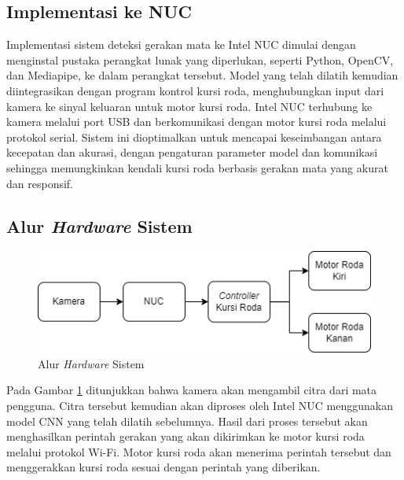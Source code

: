 \subsection{Implementasi ke NUC}

Implementasi sistem deteksi gerakan mata ke Intel NUC dimulai dengan menginstal pustaka perangkat lunak yang diperlukan, seperti Python, OpenCV, dan Mediapipe, ke dalam perangkat tersebut. Model yang telah dilatih kemudian diintegrasikan dengan program kontrol kursi roda, menghubungkan input dari kamera ke sinyal keluaran untuk motor kursi roda. Intel NUC terhubung ke kamera melalui port USB dan berkomunikasi dengan motor kursi roda melalui protokol serial. Sistem ini dioptimalkan untuk mencapai keseimbangan antara kecepatan dan akurasi, dengan pengaturan parameter model dan komunikasi sehingga memungkinkan kendali kursi roda berbasis gerakan mata yang akurat dan responsif.

\subsection{Alur \textit{Hardware} Sistem}

\begin{figure} [ht] \centering
  \includegraphics[scale=0.55]{gambar/bab3/aluralat.png}
  \caption{Alur \emph{Hardware} Sistem}
  \label{fig:aluralat}
\end{figure}

Pada Gambar \ref{fig:aluralat} ditunjukkan bahwa kamera akan mengambil citra dari mata pengguna. Citra tersebut kemudian akan diproses oleh Intel NUC menggunakan model CNN yang telah dilatih sebelumnya. Hasil dari proses tersebut akan menghasilkan perintah gerakan yang akan dikirimkan ke motor kursi roda melalui protokol Wi-Fi. Motor kursi roda akan menerima perintah tersebut dan menggerakkan kursi roda sesuai dengan perintah yang diberikan.